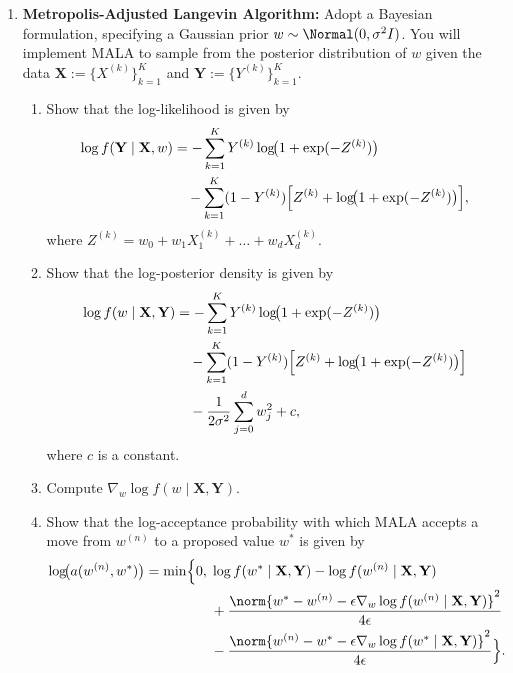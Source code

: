 \begin{enumerate}
\begin{enumerate}[label=\arabic*.]
  \item \textbf{Metropolis-Adjusted Langevin Algorithm:} Adopt a Bayesian formulation,
    specifying a Gaussian prior $w \sim \Normal(0, \sigma^2 I)$. You will implement MALA to
    sample from the posterior distribution of $w$ given the data
    $\mathbf{X} := \{X^{(k)}\}_{k=1}^K$ and $\mathbf{Y} := \{Y^{(k)}\}_{k=1}^K$.

    \begin{enumerate}[label=\alph*),start=2]
      \item Show that the log-likelihood is given by
        \begin{align*}
          \log f(\mathbf{Y} \mid \mathbf{X}, w)
          &= -\sum_{k=1}^K Y^{(k)} \log\!\bigl(1 + \exp(-Z^{(k)})\bigr) \\
          &\quad - \sum_{k=1}^K (1-Y^{(k)})\Bigl[Z^{(k)} + \log\!\bigl(1 + \exp(-Z^{(k)})\bigr)\Bigr],
        \end{align*}
        where $Z^{(k)} = w_0 + w_1 X_1^{(k)} + \ldots + w_d X_d^{(k)}$.

      \item Show that the log-posterior density is given by
        \begin{align*}
          \log f(w \mid \mathbf{X}, \mathbf{Y})
          &= -\sum_{k=1}^K Y^{(k)} \log\!\bigl(1 + \exp(-Z^{(k)})\bigr) \\
          &\quad - \sum_{k=1}^K (1-Y^{(k)})\Bigl[Z^{(k)} + \log\!\bigl(1 + \exp(-Z^{(k)})\bigr)\Bigr] \\
          &\quad - \frac{1}{2\sigma^2}\sum_{j=0}^d w_j^2 + c,
        \end{align*}
        where $c$ is a constant.

      \item Compute $\nabla_w \log f(w \mid \mathbf{X}, \mathbf{Y})$.

      \item Show that the log-acceptance probability with which MALA accepts a move from
        $w^{(n)}$ to a proposed value $w^*$ is given by
        \begin{align*}
          \log\!\bigl(a(w^{(n)}, w^*)\bigr)
          = \min\Bigl\{0,\;
          &\log f(w^* \mid \mathbf{X}, \mathbf{Y}) - \log f(w^{(n)} \mid \mathbf{X}, \mathbf{Y}) \\
          &+ \frac{\norm{w^* - w^{(n)} - \epsilon\nabla_w \log f(w^{(n)} \mid \mathbf{X}, \mathbf{Y})}^2}{4\epsilon} \\
          &- \frac{\norm{w^{(n)} - w^* - \epsilon\nabla_w \log f(w^* \mid \mathbf{X}, \mathbf{Y})}^2}{4\epsilon}
          \Bigr\}.
        \end{align*}


\end{enumerate}
\end{enumerate}
\end{enumerate}

